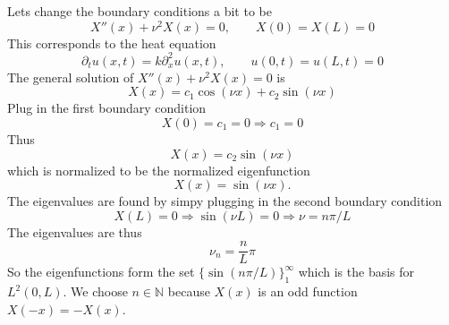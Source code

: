 Lets change the
boundary conditions a bit to be
\begin{equation}
X''(x) + \nu^{2}X(x)=0,\qquad X(0)=X(L)=0
\end{equation}
This corresponds to the heat equation
\begin{equation}
\partial_{t}u(x,t) = k\partial^{2}_{x}u(x,t),\qquad
u(0,t)=u(L,t)=0
\end{equation}
The general solution of $X''(x)+\nu^2 X(x)=0$ is
\begin{equation}
X(x)=c_1\cos(\nu x)+c_2\sin(\nu x)
\end{equation}
Plug in the first boundary condition
\begin{equation}
X(0)=c_1=0\Rightarrow c_1=0
\end{equation}
Thus
\begin{equation}
X(x)=c_2\sin(\nu x)
\end{equation}
which is normalized to be the normalized eigenfunction
\begin{equation}
X(x)=\sin(\nu x).
\end{equation}
The eigenvalues are found by simpy plugging in the second
boundary condition
\begin{equation}
X(L)=0\Rightarrow \sin(\nu L)=0\Rightarrow \nu=n\pi/L
\end{equation}
The eigenvalues are thus
\begin{equation}
\nu_{n} = \frac{n}{L}\pi
\end{equation}
So the eigenfunctions form the set
$\{\sin(n\pi/L)\}^{\infty}_{1}$ which is the basis for
$L^{2}(0,L)$. We choose $n\in\mathbb{N}$ because $X(x)$ is
an odd function $X(-x)=-X(x)$. 

